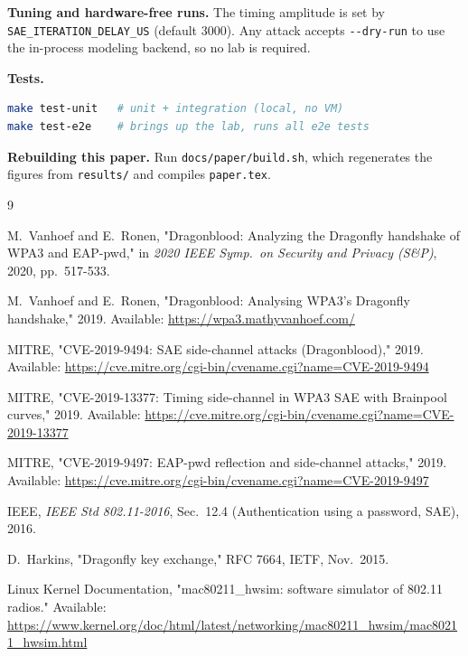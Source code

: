 \documentclass[11pt,letterpaper]{article}
\newcommand{\code}[1]{\texttt{\small #1}}
\begin{document}
\noindent\textbf{Tuning and hardware-free runs.} The timing amplitude is set by
\code{SAE\_ITERATION\_DELAY\_US} (default 3000). Any attack accepts
\code{-{}-dry-run} to use the in-process modeling backend, so no lab is required.

\noindent\textbf{Tests.}
\begin{lstlisting}[language=bash]
make test-unit   # unit + integration (local, no VM)
make test-e2e    # brings up the lab, runs all e2e tests
\end{lstlisting}

\noindent\textbf{Rebuilding this paper.} Run \code{docs/paper/build.sh}, which
regenerates the figures from \code{results/} and compiles \code{paper.tex}.

\clearpage
\begin{thebibliography}{9}

M.~Vanhoef and E.~Ronen, "Dragonblood: Analyzing the Dragonfly handshake of
WPA3 and EAP-pwd," in \emph{2020 IEEE Symp.\ on Security and Privacy (S\&P)},
2020, pp.\ 517-533.

M.~Vanhoef and E.~Ronen, "Dragonblood: Analysing WPA3's Dragonfly handshake,"
2019. Available: \url{https://wpa3.mathyvanhoef.com/}

MITRE, "CVE-2019-9494: SAE side-channel attacks (Dragonblood)," 2019.
Available: \url{https://cve.mitre.org/cgi-bin/cvename.cgi?name=CVE-2019-9494}

MITRE, "CVE-2019-13377: Timing side-channel in WPA3 SAE with Brainpool
curves," 2019. Available:
\url{https://cve.mitre.org/cgi-bin/cvename.cgi?name=CVE-2019-13377}

MITRE, "CVE-2019-9497: EAP-pwd reflection and side-channel attacks," 2019.
Available: \url{https://cve.mitre.org/cgi-bin/cvename.cgi?name=CVE-2019-9497}

IEEE, \emph{IEEE Std 802.11-2016}, Sec.\ 12.4 (Authentication using a password,
SAE), 2016.

D.~Harkins, "Dragonfly key exchange," RFC 7664, IETF, Nov.\ 2015.

Linux Kernel Documentation, "mac80211\_hwsim: software simulator of 802.11
radios." Available:
\url{https://www.kernel.org/doc/html/latest/networking/mac80211_hwsim/mac80211_hwsim.html}

\end{thebibliography}
\end{document}
